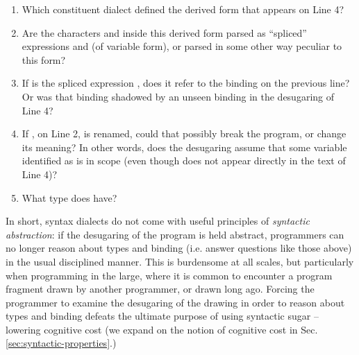 \begin{enumerate}
\item Which constituent dialect defined the derived form that appears on Line 4?
\item Are the characters  and  inside this derived form parsed as ``spliced'' expressions  and  (of variable form), or parsed in some other way peculiar to this form?
\item If  is the spliced expression , does it refer to the binding on the previous line? Or was that binding shadowed by an unseen binding in the desugaring of Line 4?
\item If , on Line 2, is renamed, could that possibly break the program, or change its meaning? In other words, does the desugaring  assume that some variable identified as  is in scope (even though  does not appear directly in the text of Line 4)?
\item What type does  have?
\end{enumerate}
In short, syntax dialects do not come with useful principles of \emph{syntactic abstraction}: if the desugaring of the program is held abstract, programmers can no longer reason about types and binding (i.e. answer questions like those above) in the usual disciplined manner. This is burdensome at all scales, but particularly when programming in the large, where it is common to encounter a program fragment drawn by another programmer, or drawn  long ago. Forcing the programmer to examine the desugaring of the drawing in order to reason about types and binding defeats the ultimate purpose of using syntactic sugar -- lowering cognitive cost (we expand on the notion of cognitive cost in Sec. \ref{sec:syntactic-properties}.)



